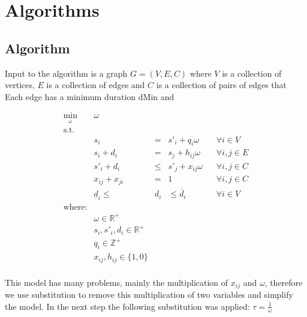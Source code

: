 \chapter{Algorithms}
\label{ch:algorithms}
\graphicspath{{chapters/Algorithms/}}

\section{Algorithm}
Input to the algorithm is a graph \(G=(V, E, C)\) where \(V\) is a collection of vertices, $E$ is a collection of edges and $C$ is a collection of pairs of edges that 
Each edge has a minimum duration dMin and 

\begin{equation}
\begin{matrix}
\displaystyle \min_\omega & \omega  \\
\textrm{s.t.} \\
& s_i & = & s'_i + q_i \omega & & \forall i \in V \\
& s_i + d_i & = & s_j + h_{ij} \omega & & \forall i, j \in E \\
& s'_i + d_i & \leq & s'_j + x_{ij} \omega & & \forall i, j \in C \\
& x_{ij} + x_{ji} & = & 1 & & \forall i, j \in C \\
& \underline{d}_i \leq &  d_i & \leq \overline{d}_i & & \forall i \in V \\

\textrm{where:} \\
& \omega \in \mathbb{R}^+\\
& s_i, s'_i, d_i \in \mathbb{R}^+\\
& q_i \in \mathbb{Z}^+\\
& x_{ij}, h_{ij} \in \{1, 0\} \\

\end{matrix}
\end{equation}

This model has many problems, mainly the multiplication of $x_{ij}$ and  $\omega$, therefore we use substitution to remove this multiplication of two variables and simplify the model. In the next step the following substitution was applied: $\tau = \frac{1}{\omega}$


